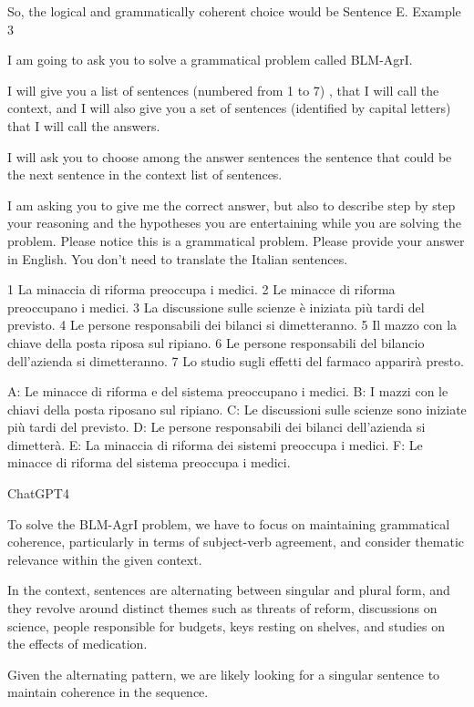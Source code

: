 So, the logical and grammatically coherent choice would be Sentence E.
Example 3

I am going to ask you to solve a grammatical problem called BLM-AgrI.  

I will give you a list of sentences (numbered from 1 to 7) , that I will call the context, and I will also give you a set of sentences (identified by capital letters) that I will call  the answers. 

I will ask you to choose among the answer sentences the sentence that could be the next sentence in the context list of sentences.

I am asking you to give me the correct answer, but also to describe step by step  your reasoning and the hypotheses you are entertaining while you are solving the problem. Please notice this is a grammatical problem.
Please provide your answer in English. You don't need to translate the Italian sentences.


1 La minaccia di riforma preoccupa i medici.
2 Le minacce di riforma preoccupano i medici.
3 La discussione sulle scienze è iniziata più tardi del previsto.
4 Le persone responsabili dei bilanci si dimetteranno.
5 Il mazzo con la chiave della posta riposa sul ripiano.
6 Le persone responsabili del bilancio dell'azienda si dimetteranno.
7 Lo studio sugli effetti del farmaco apparirà presto.

A: Le minacce di riforma e del sistema preoccupano i medici.
B: I mazzi con le chiavi della posta riposano sul ripiano.
C: Le discussioni sulle scienze sono iniziate più tardi del previsto.
D: Le persone responsabili dei bilanci dell'azienda si dimetterà.
E: La minaccia di riforma dei sistemi preoccupa i medici.
F: Le minacce di riforma del sistema preoccupa i medici.

ChatGPT4

To solve the BLM-AgrI problem, we have to focus on maintaining grammatical coherence, particularly in terms of subject-verb agreement, and consider thematic relevance within the given context.

In the context, sentences are alternating between singular and plural form, and they revolve around distinct themes such as threats of reform, discussions on science, people responsible for budgets, keys resting on shelves, and studies on the effects of medication.

Given the alternating pattern, we are likely looking for a singular sentence to maintain coherence in the sequence.

